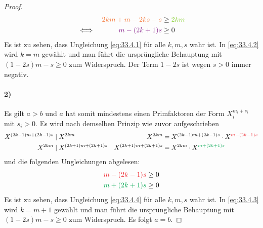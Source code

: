 \begin{proof}
  \begin{equation}
    \label{eq:33.4.2}
    \begin{aligned}
           &  & \textcolor{Orange}{2km + m - 2ks - s} & \geq \textcolor{LimeGreen}{2km} \\
      \iff &  & \textcolor{Fuchsia}{m - (2k + 1)s}    & \geq 0                          \\
    \end{aligned}
  \end{equation}
  \noindent
  Es ist zu sehen, dass Ungleichung \ref{eq:33.4.1} für alle $k,m,s$ wahr ist. In \ref{eq:33.4.2}
  wird $k = m$ gewählt und man führt die ursprüngliche Behauptung mit
  $(1 - 2s)m -s \geq 0$ zum Widerspruch. Der Term $1 - 2s$ ist wegen $s > 0$ immer negativ.

  \paragraph{2)}
  Es gilt $a > b$ und $a$ hat somit mindestens einen Primfaktoren
  der Form $X_i^{m_i + s_i}$ mit $s_i > 0$. Es wird nach demselben Prinzip wie zuvor aufgeschrieben
  \begin{align*}
    X^{(2k - 1)m + (2k -1)s}  & \mid X^{2km}                                         &
    X^{2km}                   & = X^{(2k - 1)m + (2k -1)s}
    \cdot X^{\textcolor{Red}{m - (2k - 1)s}}                                           \\
    X^{2km}                   & \mid X^{(2k + 1)m + (2k + 1)s}                       &
    X^{(2k + 1)m + (2k + 1)s} & = X^{2km} \cdot X^{\textcolor{Green}{m + (2k + 1)s}}
  \end{align*}
  und die folgenden Ungleichungen abgelesen:
  \begin{align}
    \label{eq:33.4.3}
    \textcolor{Red}{m - (2k - 1)s}   & \geq 0 \\
    \label{eq:33.4.4}
    \textcolor{Green}{m + (2k + 1)s} & \geq 0
  \end{align}
  Es ist zu sehen, dass Ungleichung \ref{eq:33.4.4} für alle $k,m,s$ wahr ist. In \ref{eq:33.4.3}
  wird $k = m + 1$ gewählt und man führt die ursprüngliche Behauptung
  mit $(1 - 2s)m - s \geq 0$ zum Widerspruch.\bignewline
  Es folgt $a = b$.
\end{proof}
